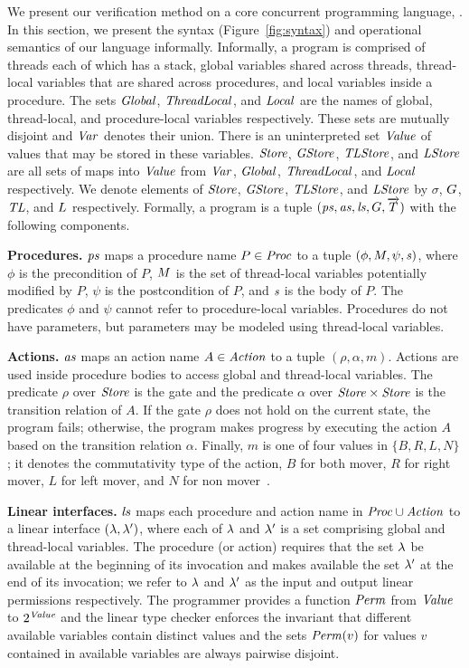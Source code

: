 We present our verification method on a core concurrent programming language, \civl.
In this section, we present the syntax (Figure~\ref{fig:syntax}) and operational semantics of our language informally.
Informally, a \civl program is comprised of threads each of which has a stack, global variables shared across threads, 
thread-local variables that are shared across procedures, and local variables inside a procedure.
The sets $\mathit{Global}$, $\mathit{ThreadLocal}$, and $\mathit{Local}$ are the names of global, thread-local, and procedure-local variables 
respectively.
These sets are mutually disjoint and $\mathit{Var}$ denotes their union.
There is an uninterpreted set $\mathit{Value}$ of values that may be stored in these variables.
$\mathit{Store}$, $\mathit{GStore}$, $\mathit{TLStore}$, and $\mathit{LStore}$ are all sets of maps into $\mathit{Value}$
from $\mathit{Var}$, $\mathit{Global}$, $\mathit{ThreadLocal}$, and $\mathit{Local}$ respectively.
We denote elements of $\mathit{Store}$, $\mathit{GStore}$, $\mathit{TLStore}$, and $\mathit{LStore}$
by $\sigma$, $G$, $\mathit{TL}$, and $L$ respectively.
Formally, a \civl program is a tuple $(\mathit{ps}, \mathit{as}, \mathit{ls}, G, \overrightarrow{T})$ with the following components.

\noindent
{\bf Procedures.}
$\mathit{ps}$ maps a procedure name $P \in \mathit{Proc}$ to a tuple $(\phi, M, \psi, \mathit{s})$, 
where $\phi$ is the precondition of $P$, $M$ is the set of thread-local variables potentially modified by $P$, 
$\psi$ is the postcondition of $P$, and $\mathit{s}$ is the body of $P$.
The predicates $\phi$ and $\psi$ cannot refer to procedure-local variables.
Procedures do not have parameters, but parameters may be modeled using thread-local variables.

\noindent
{\bf Actions.}
$\mathit{as}$ maps an action name $A \in \mathit{Action}$ to a tuple $(\rho,\alpha,m)$.
Actions are used inside procedure bodies to access global and thread-local variables.
The predicate $\rho$ over $\mathit{Store}$ is the gate and the predicate $\alpha$ over $\mathit{Store} \times \mathit{Store}$ 
is the transition relation of $A$.
If the gate $\rho$ does not hold on the current state, the program fails;
otherwise, the program makes progress by executing the action $A$ based on the transition relation $\alpha$.
Finally, $m$ is one of four values in $\{B,R,L,N\}$;
it denotes the commutativity type of the action, $B$ for both mover, $R$ for right mover, $L$ for left mover, 
and $N$ for non mover~\cite{FlanaganFLQ08}. 

\noindent
{\bf Linear interfaces.}
$\mathit{ls}$ maps each procedure and action name in $\mathit{Proc} \cup \mathit{Action}$ to a linear interface 
$(\lambda,\lambda')$, where each of $\lambda$ and $\lambda'$ is a set comprising global and thread-local variables.
The procedure (or action) requires that the set $\lambda$ be available at the beginning of its invocation 
and makes available the set $\lambda'$ at the end of its invocation; 
we refer to $\lambda$ and $\lambda'$ as the input and output linear permissions respectively.
The programmer provides a function $\mathit{Perm}$ from $\mathit{Value}$ to $2^{\mathit{Value}}$
and the linear type checker enforces the invariant that 
different available variables contain distinct values and 
the sets $\mathit{Perm}(v)$ for values $v$ contained in available variables are always pairwise disjoint.

